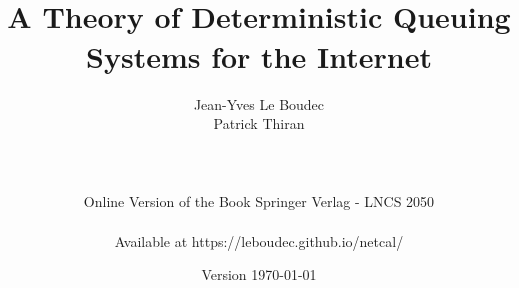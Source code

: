 \documentclass[11pt,twoside,onecolumn,a4paper]{book}
\begin{document}



 \title{
 \\
 A Theory of Deterministic Queuing Systems for the Internet\\
 }
 \author{ {\sc Jean-Yves Le Boudec}  \\{\sc Patrick Thiran}\\
 ~\vspace{1cm}\\
 \framebox[16cm]{\parbox{15cm}{}}
 \\
  ~\vspace{1cm}\\
 Online Version of the Book Springer Verlag - LNCS 2050\\
 ~\\
 Available at https://leboudec.github.io/netcal/
 }
 
  

\date{Version \today}

 \maketitle
\frontmatter
\end{document}
